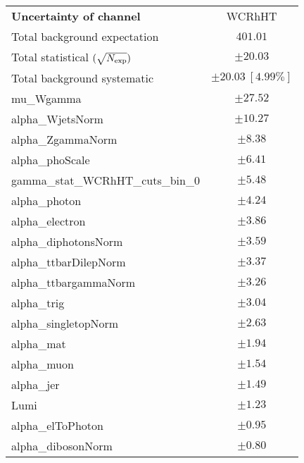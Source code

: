 
\begin{table}
\begin{center}
\setlength{\tabcolsep}{0.0pc}
\begin{tabular*}{\textwidth}{@{\extracolsep{\fill}}lc}
\noalign{\smallskip}\hline\noalign{\smallskip}
{\bf Uncertainty of channel}                                    & WCRhHT            \\
\noalign{\smallskip}\hline\noalign{\smallskip}
Total background expectation             &  $401.01$       \\
\noalign{\smallskip}\hline\noalign{\smallskip}
Total statistical $(\sqrt{N_{\rm exp}})$              & $\pm 20.03$       \\
Total background systematic               & $\pm 20.03\ [4.99\%] $             \\
\noalign{\smallskip}\hline\noalign{\smallskip}
\noalign{\smallskip}\hline\noalign{\smallskip}
mu\_Wgamma         & $\pm 27.52$       \\
alpha\_WjetsNorm         & $\pm 10.27$       \\
alpha\_ZgammaNorm         & $\pm 8.38$       \\
alpha\_phoScale         & $\pm 6.41$       \\
gamma\_stat\_WCRhHT\_cuts\_bin\_0         & $\pm 5.48$       \\
alpha\_photon         & $\pm 4.24$       \\
alpha\_electron         & $\pm 3.86$       \\
alpha\_diphotonsNorm         & $\pm 3.59$       \\
alpha\_ttbarDilepNorm         & $\pm 3.37$       \\
alpha\_ttbargammaNorm         & $\pm 3.26$       \\
alpha\_trig         & $\pm 3.04$       \\
alpha\_singletopNorm         & $\pm 2.63$       \\
alpha\_mat         & $\pm 1.94$       \\
alpha\_muon         & $\pm 1.54$       \\
alpha\_jer         & $\pm 1.49$       \\
Lumi         & $\pm 1.23$       \\
alpha\_elToPhoton         & $\pm 0.95$       \\
alpha\_dibosonNorm         & $\pm 0.80$       \\

\end{tabular*}
\end{center}
\end{table}
